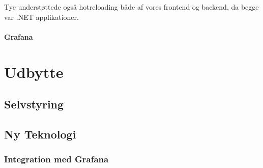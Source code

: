 \documentclass[a4paper]{article}
\begin{document}
Tye understøttede også hotreloading både af vores frontend og backend,
da begge var .NET applikationer.

\paragraph{Grafana}


\section{Udbytte}
\label{udbytte}
\subsection{Selvstyring}
\subsection{Ny Teknologi}
\subsubsection{Integration med Grafana}
\end{document}
